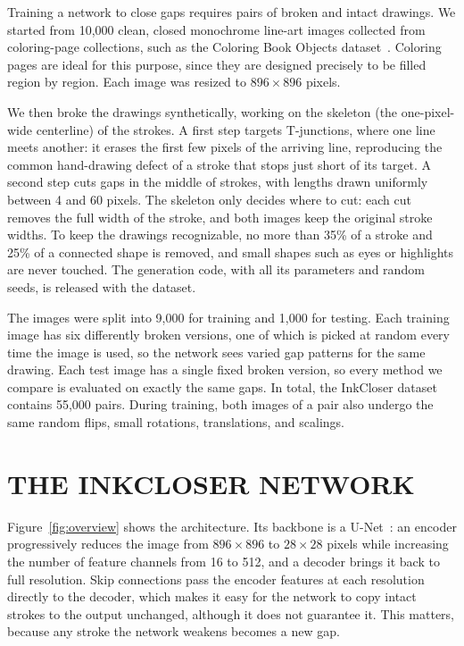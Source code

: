 \documentclass{IEEEcsmag}
\providecommand{\DIFaddtex}[1]{{\color{blue}#1}} %
\providecommand{\DIFdeltex}[1]{} %
\providecommand{\DIFaddbegin}{} %
\providecommand{\DIFaddend}{} %
\providecommand{\DIFdelbegin}{} %
\providecommand{\DIFdelend}{} %
\providecommand{\DIFaddtex}[1]{\DIFaddtex{#1}} %
\providecommand{\DIFdeltex}[1]{\DIFdeltex{#1}} %
\providecommand{\DIFaddbegin}{} %
\providecommand{\DIFadd}[1]{\texorpdfstring{\DIFaddtex{#1}}{#1}} %
\providecommand{\DIFdel}[1]{\texorpdfstring{\DIFdeltex{#1}}{}} %
\begin{document}
Training a network to close gaps requires pairs of broken and intact drawings. We
started from 10,000 clean, closed monochrome line-art images collected from
coloring-page collections, such as the Coloring Book Objects
dataset~\cite{chen2019human}. Coloring pages are ideal for this purpose, since they
are designed precisely to be filled region by region. Each image was resized to
$896\times 896$ pixels.

We then broke the drawings synthetically, working on the skeleton (the one-pixel-wide
centerline) of the strokes. A first step targets T-junctions, where one line meets
another: it erases the first few pixels of the arriving line, reproducing the common
hand-drawing defect of a stroke that stops just short of its target. A second step
cuts gaps in the middle of strokes\DIFdelbegin \DIFdel{. }\DIFdelend \DIFaddbegin \DIFadd{, with lengths drawn uniformly between 4 and 60
pixels. The skeleton only decides where to cut: each cut removes the full width of the
stroke, and both images keep the original stroke widths. }\DIFaddend To keep the drawings
recognizable, no more than
35\% of a stroke and 25\% of a connected shape is removed, and small shapes such as
eyes or highlights are never touched. \DIFaddbegin \DIFadd{The generation code, with all its parameters
and random seeds, is released with the dataset.
}\DIFaddend 

The images were split into 9,000 for training and 1,000 for testing. Each training
image has six differently broken versions, one of which is picked at random every
time the image is used, so the network sees varied gap patterns for the same drawing.
Each test image has a single fixed broken version, so every method we compare is
evaluated on exactly the same gaps. In total, the InkCloser dataset contains 55,000
pairs. During training, both images of a pair also undergo the same random flips,
small rotations, translations, and scalings.

\section{THE INKCLOSER NETWORK}

Figure~\ref{fig:overview} shows the architecture. Its backbone is a U-Net~\cite{ronneberger2015unet}:
an encoder progressively reduces the image from $896\times 896$ to $28\times 28$
pixels while increasing the number of feature channels from 16 to 512, and a decoder
brings it back to full resolution. Skip connections pass the encoder features at each
resolution directly to the decoder, which makes it easy for the network to copy
intact strokes to the output unchanged\DIFaddbegin \DIFadd{, although it does not guarantee it}\DIFaddend . This matters, because any stroke the network
weakens becomes a new gap.
\end{document}

